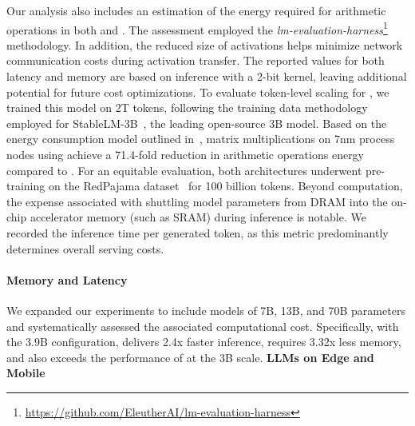 \begin{itemize}
Our analysis also includes an estimation of the energy required for arithmetic operations in both  and . The assessment employed the \emph{lm-evaluation-harness}\footnote{\url{https://github.com/EleutherAI/lm-evaluation-harness}} methodology. In addition, the reduced size of activations helps minimize network communication costs during activation transfer. The reported values for both latency and memory are based on inference with a 2-bit kernel, leaving additional potential for future cost optimizations. To evaluate token-level scaling for , we trained this model on 2T tokens, following the training data methodology employed for StableLM-3B~\cite{StableLM-3B-4E1T}, the leading open-source 3B model. Based on the energy consumption model outlined in~\cite{energycost, pokebnn}, matrix multiplications on 7nm process nodes using  achieve a 71.4-fold reduction in arithmetic operations energy compared to . For an equitable evaluation, both architectures underwent pre-training on the RedPajama dataset~\cite{redpajama} for 100 billion tokens. Beyond computation, the expense associated with shuttling model parameters from DRAM into the on-chip accelerator memory (such as SRAM) during inference is notable. We recorded the inference time per generated token, as this metric predominantly determines overall serving costs. \paragraph{Memory and Latency}

We expanded our experiments to include models of 7B, 13B, and 70B parameters and systematically assessed the associated computational cost. Specifically, with the 3.9B configuration,  delivers 2.4x faster inference, requires 3.32x less memory, and also exceeds the performance of  at the 3B scale. \textbf{LLMs on Edge and Mobile}


\end{itemize}
